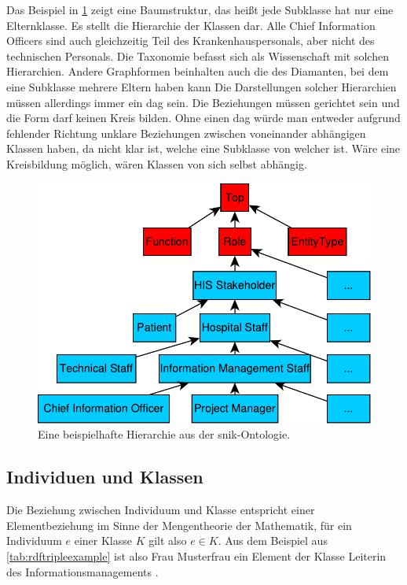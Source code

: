 Das Beispiel in \cref{fig:snikhierarchy} zeigt eine Baumstruktur, das heißt jede Subklasse hat nur eine Elternklasse.
Es stellt die Hierarchie der Klassen dar.
Alle Chief Information Officers sind auch gleichzeitig Teil des Krankenhauspersonals, aber nicht des technischen Personals.
Die Taxonomie befasst sich als Wissenschaft mit solchen Hierarchien.
Andere Graphformen beinhalten auch die des Diamanten, bei dem eine Subklasse mehrere Eltern haben kann
Die Darstellungen solcher Hierarchien müssen allerdings immer ein \ac{dag} sein.
Die Beziehungen müssen gerichtet sein und die Form darf keinen Kreis bilden.
Ohne einen \ac{dag} würde man entweder aufgrund fehlender Richtung unklare Beziehungen zwischen voneinander abhängigen Klassen haben, da nicht klar ist, welche eine Subklasse von welcher ist.
Wäre eine Kreisbildung möglich, wären Klassen von sich selbst abhängig.

\begin{figure}%
\centering
\includegraphics[width=\textwidth, height=\textheight, keepaspectratio]{Images/hierarchy.pdf}
\caption[Beispiel für Hierarchie]{Eine beispielhafte Hierarchie aus der \ac{snik}-Ontologie.}
\label{fig:snikhierarchy}
\end{figure}

\subsection{Individuen und Klassen}
\label{sec:individuenundklassen}
Die Beziehung zwischen Individuum und Klasse entspricht einer Elementbeziehung im Sinne der Mengentheorie der Mathematik, für ein Individuum $e$ einer Klasse $K$ gilt also $e \in K$.
Aus dem Beispiel aus \cref{tab:rdftripleexample} ist also Frau Musterfrau ein Element der Klasse Leiterin des Informationsmanagements \citep[S.~261]{semanticwebgrundlagen}.

